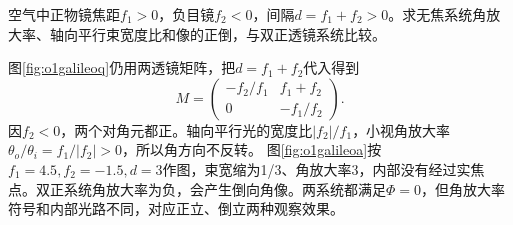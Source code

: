 \begin{exercise}\label{ex:o1galilean}
空气中正物镜焦距$f_1>0$，负目镜$f_2<0$，间隔$d=f_1+f_2>0$。求无焦系统角放大率、轴向平行束宽度比和像的正倒，与双正透镜系统比较。
\end{exercise}
\begin{solution}
图\ref{fig:o1galileoq}仍用两透镜矩阵，把$d=f_1+f_2$代入得到
\[
 M=\begin{pmatrix}-f_2/f_1&f_1+f_2\\0&-f_1/f_2\end{pmatrix}.
\]
因$f_2<0$，两个对角元都正。轴向平行光的宽度比$|f_2|/f_1$，小视角放大率$\theta_o/\theta_i=f_1/|f_2|>0$，所以角方向不反转。
图\ref{fig:o1galileoa}按$f_1=4.5,f_2=-1.5,d=3$作图，束宽缩为1/3、角放大率3，内部没有经过实焦点。双正系统角放大率为负，会产生倒向角像。两系统都满足$\Phi=0$，但角放大率符号和内部光路不同，对应正立、倒立两种观察效果。
\end{solution}
